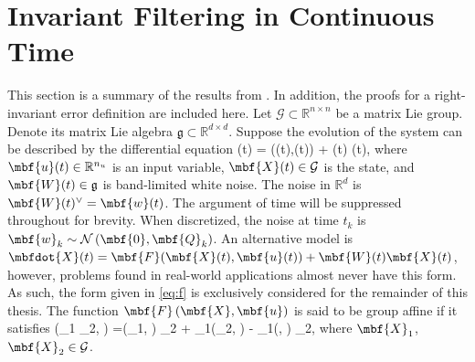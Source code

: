 \section{Invariant Filtering in Continuous Time}
\label{sec:IEKF_c}

This section is a summary of the results from \cite{Barrau2017}. In addition, the proofs for a right-invariant error definition are included here. Let $\mathcal{G} \subset \mathbb{R}^{n \times n}$ be a matrix Lie group. Denote its matrix Lie algebra $\mathfrak{g} \subset \mathbb{R}^{d \times d}$. Suppose the evolution of the system can be described by the differential equation
\beq
	(t) = ((t),(t)) + (t) (t), \label{eq:f}
\eeq
where $\mbf{u}(t) \in \mathbb{R}^{n_u}$ is an input variable, $\mbf{X}(t) \in \mathcal{G}$ is the state, and $\mbf{W}(t) \in \mathfrak{g}$ is band-limited white noise. The noise in $\mathbb{R}^d$ is $\mbf{W}(t)^{\vee} = \mbf{w}(t)$. The argument of time will be suppressed throughout for brevity. When discretized, the noise at time $t_k$ is $\mbf{w}_k \sim \mathcal{N} \left(\mbf{0},\mbf{Q}_k\right)$.  An alternative model is $\mbfdot{X}(t) = \mbf{F}(\mbf{X}(t),\mbf{u}(t)) + \mbf{W}(t)\mbf{X}(t) $, however, problems found in real-world applications almost never have this form. As such, the form given in \eqref{eq:f} is exclusively considered for the remainder of this thesis. The function $\mbf{F}\left(\mbf{X},\mbf{u}\right)$ is said to be group affine if it satisfies
\beq
	\left(_1 _2, \right) =\left(_1, \right) _2 + _1\left(_2, \right) - _1\left(, \right) _2, \label{eq:inv_rel} 
\eeq
where $\mbf{X}_1$, $\mbf{X}_2 \in \mathcal{G}$. 



